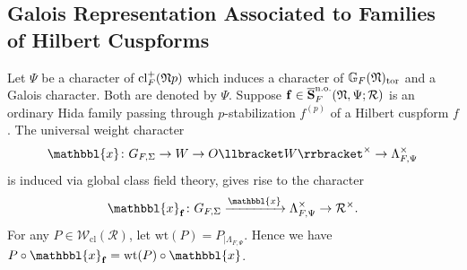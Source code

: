 \documentclass[10pt]{amsart}
\numberwithin{equation}{section}
\theoremstyle{definition}
\theoremstyle{remark} %
\newcommand{\bb}{\mathbb}
\newcommand{\mbf}{\mathbf}
\newcommand{\mrm}{\mathrm}
\newcommand{\f}{\mathbf{f}}
\newcommand{\R}{\mathcal{R}}
\newcommand{\W}{\mathcal{W}}
\begin{document}
	\subsection{Galois Representation Associated to Families of Hilbert Cuspforms}
	\label{2.3}
	Let $ \Psi $ be a character of $ \mrm{cl}_F^+(\frak{N}p) $ which induces a character of $ \bb{G}_F(\frak{N})_{\mrm{tor}} $ and a Galois character. Both are denoted by $ \Psi $. Suppose $ \f \in \overline{\mbf{S}}_F^\mrm{n.o.}(\frak{N},\Psi;\R)$ is an ordinary Hida family passing through $ p $-stabilization $ f^{(p)} $ of a Hilbert cuspform $ f $. The universal weight character 
	$$ \mathbbl{x} \colon G_{F,\Sigma} \rightarrow W \rightarrow O\llbracket W  \rrbracket^\times \rightarrow  \Lambda_{F,\Psi}^\times  $$
	is induced via global class field theory, gives rise to the character
	$$ \mathbbl{x}_{\f} \colon G_{F,\Sigma} \xrightarrow{\mathbbl{x}}  \Lambda_{F,\Psi}^\times  \rightarrow \R^\times. $$ 
	For any $ P \in \W_{\mrm{cl}}(\R) $, let $  \mrm{wt}(P) = P_{\mid \Lambda_{F,\Psi}} $. Hence we have $ P \circ  \mathbbl{x}_{\f} = \mrm{wt}(P) \circ \mathbbl{x}  $. 
	
\end{document}
